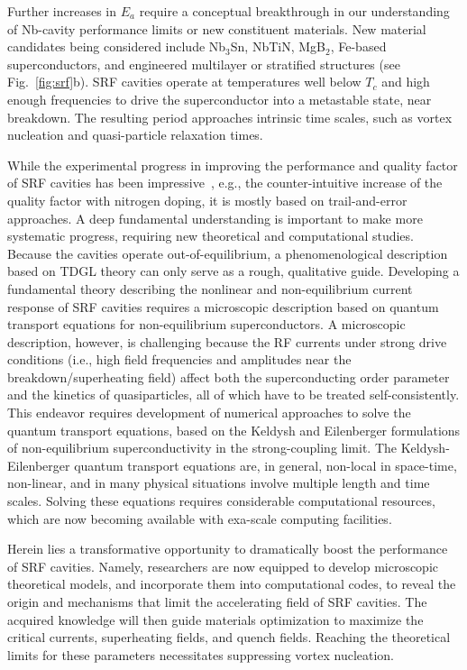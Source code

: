 \documentclass[%
 aip,
 amsmath,amssymb,
 reprint,%
floatfix]{revtex4-1}
\newcommand{\Tc}{T_{c}}
\begin{document}
Further increases in $E_a$ require a conceptual breakthrough in our understanding of Nb-cavity performance limits or new constituent materials. New material candidates being considered include Nb$_3$Sn, NbTiN, MgB$_2$, Fe-based superconductors, and engineered multilayer or stratified structures (see Fig.~\ref{fig:srf}b). SRF cavities operate at temperatures well below $\Tc$ and high enough frequencies to drive the superconductor into a metastable state, near breakdown. The resulting period approaches intrinsic time scales, such as vortex nucleation and quasi-particle relaxation times. 



While the experimental progress in improving the performance and quality factor of SRF cavities has been impressive~\cite{SRF2017}, e.g., the counter-intuitive increase of the quality factor with nitrogen doping, it is mostly based on trail-and-error approaches. A deep fundamental understanding is important to make more systematic progress, requiring new theoretical and computational studies. Because the cavities operate out-of-equilibrium, a phenomenological description based on TDGL theory can only serve as a rough, qualitative guide. Developing a fundamental theory describing the nonlinear and non-equilibrium current response of SRF cavities requires a microscopic description based on quantum transport equations for non-equilibrium superconductors. A microscopic description, however, is challenging because the RF currents under strong drive conditions (i.e., high field frequencies and amplitudes near the breakdown/superheating field) affect both the superconducting order parameter and the kinetics of quasiparticles, all of which have to be treated self-consistently. This endeavor requires development of numerical approaches to solve the quantum transport equations, based on the Keldysh and Eilenberger formulations of non-equilibrium superconductivity in the strong-coupling limit. The Keldysh-Eilenberger quantum transport equations are, in general, non-local in space-time, non-linear, and in many physical situations involve multiple length and time scales. Solving these equations requires considerable computational resources, which are now becoming available with exa-scale computing facilities.



Herein lies a transformative opportunity to dramatically boost the performance of SRF cavities. Namely, researchers are now equipped to develop microscopic theoretical models, and incorporate them into computational codes, to reveal the origin and mechanisms that limit the accelerating field of SRF cavities.  The acquired knowledge will then guide materials optimization to maximize the critical currents, superheating fields, and quench fields. Reaching the theoretical limits for these parameters necessitates suppressing vortex nucleation.  
\end{document}
